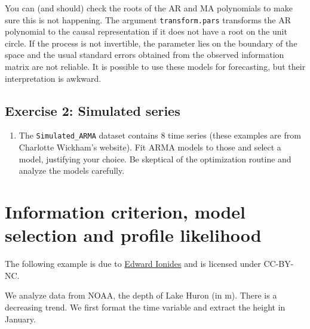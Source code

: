 \documentclass[]{book}
\providecommand{\tightlist}{%
  \setlength{\itemsep}{0pt}\setlength{\parskip}{0pt}}
\begin{document}
You can (and should) check the roots of the AR and MA polynomials to
make sure this is not happening. The argument \texttt{transform.pars}
transforms the AR polynomial to the causal representation if it does not
have a root on the unit circle. If the process is not invertible, the
parameter lies on the boundary of the space and the usual standard
errors obtained from the observed information matrix are not reliable.
It is possible to use these models for forecasting, but their
interpretation is awkward.

\hypertarget{exercise-2-simulated-series}{%
\subsection{Exercise 2: Simulated
series}\label{exercise-2-simulated-series}}

\begin{enumerate}
\def\labelenumi{\arabic{enumi}.}
\tightlist
\item
  The \texttt{Simulated\_ARMA} dataset contains 8 time series (these
  examples are from Charlotte Wickham's website). Fit ARMA models to
  those and select a model, justifying your choice. Be skeptical of the
  optimization routine and analyze the models carefully.
\end{enumerate}

\hypertarget{information-criterion-model-selection-and-profile-likelihood}{%
\section{Information criterion, model selection and profile
likelihood}\label{information-criterion-model-selection-and-profile-likelihood}}

The following example is due to
\href{http://ionides.github.io/531w16/notes05/notes5.html}{Edward
Ionides} and is licensed under CC-BY-NC.

We analyze data from NOAA, the depth of Lake Huron (in m). There is a
decreasing trend. We first format the time variable and extract the
height in January.
\end{document}

